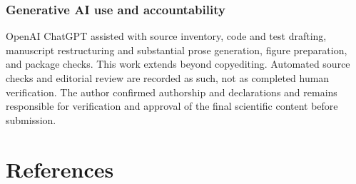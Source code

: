 \documentclass[
  11pt,
]{article}
\begin{document}
\subsubsection{Generative AI use and
accountability}\label{generative-ai-use-and-accountability}

OpenAI ChatGPT assisted with source inventory, code and test drafting,
manuscript restructuring and substantial prose generation, figure
preparation, and package checks. This work extends beyond copyediting.
Automated source checks and editorial review are recorded as such, not
as completed human verification. The author confirmed authorship and
declarations and remains responsible for verification and approval of
the final scientific content before submission.

\section*{References}\label{bibliography}
\end{document}
